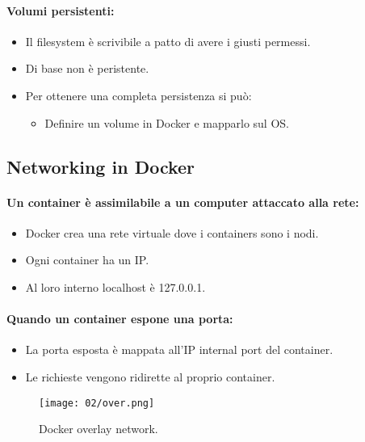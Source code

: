 \paragraph{Volumi persistenti:}

\begin{itemize}
	\item Il filesystem è scrivibile a patto di avere i giusti permessi.
	\item Di base non è peristente.
	\item Per ottenere una completa persistenza si può:
	      \begin{itemize}
		      \item Definire un volume in Docker e mapparlo sul OS.
	      \end{itemize}
\end{itemize}

\subsection{Networking in Docker}

\paragraph{Un container è assimilabile a un computer attaccato alla rete:}

\begin{itemize}
	\item Docker crea una rete virtuale dove i containers sono i nodi.
	\item Ogni container ha un IP.
	\item Al loro interno localhost è 127.0.0.1.
\end{itemize}

\paragraph{Quando un container espone una porta:}

\begin{itemize}
	\item La porta esposta è mappata all'IP internal port del container.
	\item Le richieste vengono ridirette al proprio container.
\end{itemize}

\begin{figure}[h]
	\centering
	\texttt{[image: 02/over.png]}
	\caption{Docker overlay network.}
\end{figure}


